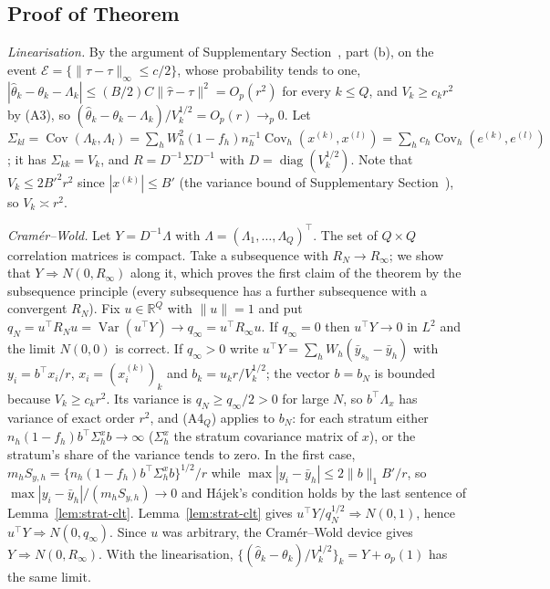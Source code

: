 \subsection{Proof of Theorem~}\label{si:testing-joint}

\emph{Linearisation.} By the argument of Supplementary Section~, part (b), on the event $\mathcal E=\{\|\hat\tau-\tau\|_\infty\le c/2\}$, whose probability tends to one, $|\hat\theta_k-\theta_k-\Lambda_k|\le(B/2)C\|\hat\tau-\tau\|^2=O_p(r^2)$ for every $k\le Q$, and $V_k\ge c_kr^2$ by (A3), so $(\hat\theta_k-\theta_k-\Lambda_k)/V_k^{1/2}=O_p(r)\to_p0$. Let $\Sigma_{kl}=\operatorname{Cov}(\Lambda_k,\Lambda_l)=\sum_hW_h^2(1-f_h)n_h^{-1}\operatorname{Cov}_h(x^{(k)},x^{(l)})=\sum_hc_h\operatorname{Cov}_h(e^{(k)},e^{(l)})$; it has $\Sigma_{kk}=V_k$, and $R=D^{-1}\Sigma D^{-1}$ with $D=\operatorname{diag}(V_k^{1/2})$. Note that $V_k\le2B'^2r^2$ since $|x^{(k)}|\le B'$ (the variance bound of Supplementary Section~), so $V_k\asymp r^2$.

\emph{Cram\'er--Wold.} Let $Y=D^{-1}\Lambda$ with $\Lambda=(\Lambda_1,\dots,\Lambda_Q)^\top$. The set of $Q\times Q$ correlation matrices is compact. Take a subsequence with $R_N\to R_\infty$; we show that $Y\Rightarrow N(0,R_\infty)$ along it, which proves the first claim of the theorem by the subsequence principle (every subsequence has a further subsequence with a convergent $R_N$). Fix $u\in\mathbb R^Q$ with $\|u\|=1$ and put $q_N=u^\top R_N u=\operatorname{Var}(u^\top Y)\to q_\infty=u^\top R_\infty u$. If $q_\infty=0$ then $u^\top Y\to0$ in $L^2$ and the limit $N(0,0)$ is correct. If $q_\infty>0$ write $u^\top Y=\sum_hW_h(\bar y_{s_h}-\bar y_h)$ with $y_i=b^\top x_i/r$, $x_i=(x^{(k)}_i)_k$ and $b_k=u_kr/V_k^{1/2}$; the vector $b=b_N$ is bounded because $V_k\ge c_kr^2$. Its variance is $q_N\ge q_\infty/2>0$ for large $N$, so $b^\top\Lambda_x$ has variance of exact order $r^2$, and (A4$_Q$) applies to $b_N$: for each stratum either $n_h(1-f_h)b^\top\Sigma^x_hb\to\infty$ ($\Sigma^x_h$ the stratum covariance matrix of $x$), or the stratum's share of the variance tends to zero. In the first case, $m_hS_{y,h}=\{n_h(1-f_h)b^\top\Sigma^x_hb\}^{1/2}/r$ while $\max|y_i-\bar y_h|\le2\|b\|_1B'/r$, so $\max|y_i-\bar y_h|/(m_hS_{y,h})\to0$ and Hájek's condition holds by the last sentence of Lemma~\ref{lem:strat-clt}. Lemma~\ref{lem:strat-clt} gives $u^\top Y/q_N^{1/2}\Rightarrow N(0,1)$, hence $u^\top Y\Rightarrow N(0,q_\infty)$. Since $u$ was arbitrary, the Cram\'er--Wold device gives $Y\Rightarrow N(0,R_\infty)$. With the linearisation, $\{(\hat\theta_k-\theta_k)/V_k^{1/2}\}_k=Y+o_p(1)$ has the same limit.

